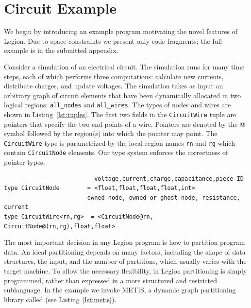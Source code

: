 
\section{Circuit Example}
\label{sec:example}


We begin by introducing an example program 
motivating the novel features of Legion.
Due to space constraints we present only code fragments;
the full example is in the submitted appendix.

Consider a simulation of an electrical circuit.
The simulation runs for many time steps, each of which performs three computations:
 calculate new currents, distribute charges, and update voltages.
The simulation takes as input an arbitrary graph of circuit elements
that have been dynamically allocated in two logical regions: {\tt all\_nodes} 
and {\tt all\_wires}.  The types of nodes and wires are 
shown in Listing~\ref{lst:tuples}.  The first two fields in the
{\tt CircuitWire} tuple are pointers that specify the two end points of
a wire.  Pointers are denoted by the @ symbol
followed by the region(s) into which the pointer may point.
The {\tt CircuitWire} type is parametrized by the local region
names {\tt rn} and {\tt rg} which contain {\tt CircuitNode} elements.
Our type system enforces the correctness of pointer types.

\begin{lstlisting}[label={lst:tuples},caption={Tuples and Pointers Example}]
--                        voltage,current,charge,capacitance,piece ID
type CircuitNode        = <float,float,float,float,int>
--                      owned node, owned or ghost node, resistance, current
type CircuitWire<rn,rg>  = <CircuitNode@rn, CircuitNode@(rn,rg),float,float>
\end{lstlisting}

The most important decision in any Legion program is how to partition
program data.  An ideal partitioning depends on many factors,
including the shape of data structures, the input, and the number of
partitions, which usually varies with the target machine.  To allow
the necessary flexibility, in Legion partitioning is simply programmed,
rather than expressed in a more structured and restricted
sublanguage.  In the example we invoke METIS\cite{Metis98}, a dynamic graph
partitioning library called (see Listing~\ref{lst:metis}).

